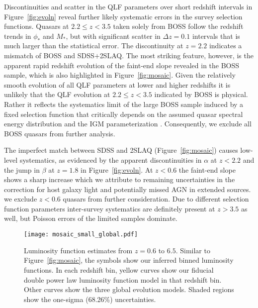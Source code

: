\documentclass[fleqn,usenatbib]{mnras}
\begin{document}
Discontinuities and scatter in the QLF parameters over short redshift
intervals in Figure~\ref{fig:evoln} reveal further likely systematic
errors in the survey selection functions.  Quasars at $2.2\le z<3.5$
taken solely from BOSS \citep{2013ApJ...773...14R} follow the redshift
trends in $\phi_*$ and $M_*$, but with significant scatter in $\Delta
z=0.1$ intervals that is much larger than the statistical error.  The
discontinuity at $z=2.2$ indicates a mismatch of BOSS and
SDSS$+$2SLAQ. The most striking feature, however, is the apparent
rapid redshift evolution of the faint-end slope revealed in the BOSS
sample, which is also highlighted in Figure~\ref{fig:mosaic}. Given
the relatively smooth evolution of all QLF parameters at lower and
higher redshifts it is unlikely that the QLF evolution at $2.2\le
z<3.5$ indicated by BOSS is physical.  Rather it reflects the
systematics limit of the large BOSS sample induced by a fixed
selection function that critically depends on the assumed quasar
spectral energy distribution and the IGM parameterization
\citep{2011ApJ...728...23W,2013ApJ...773...14R}.  Consequently, we
exclude all BOSS quasars from further analysis.



The imperfect match between SDSS and 2SLAQ (Figure~\ref{fig:mosaic})
causes low-level systematics, as evidenced by the apparent
discontinuities in $\alpha$ at $z<2.2$ and the jump in $\beta$ at
$z=1.8$ in Figure~\ref{fig:evoln}.  At $z<0.6$ the faint-end slope
shows a sharp increase which we attribute to remaining uncertainties
in the correction for host galaxy light and potentially missed AGN in
extended sources. we exclude $z<0.6$ quasars from further
consideration. Due to different selection function parameters
inter-survey systematics are definitely present at $z>3.5$ as well,
but Poisson errors of the limited samples dominate.

\begin{figure*}
  \begin{center}
    \texttt{[image: mosaic\_small\_global.pdf]}
  \end{center}
  \caption{Luminosity function estimates from $z=0.6$ to $6.5$.
    Similar to Figure~\ref{fig:mosaic}, the symbols show our inferred
    binned luminosity functions.  In each redshift bin, yellow curves
    show our fiducial double power law luminosity function model in
    that redshift bin.  Other curves show the three global evolution
    models.  Shaded regions show the one-sigma (68.26\%)
    uncertainties.}
  \label{fig:mosaic_global}
\end{figure*}
\end{document}
